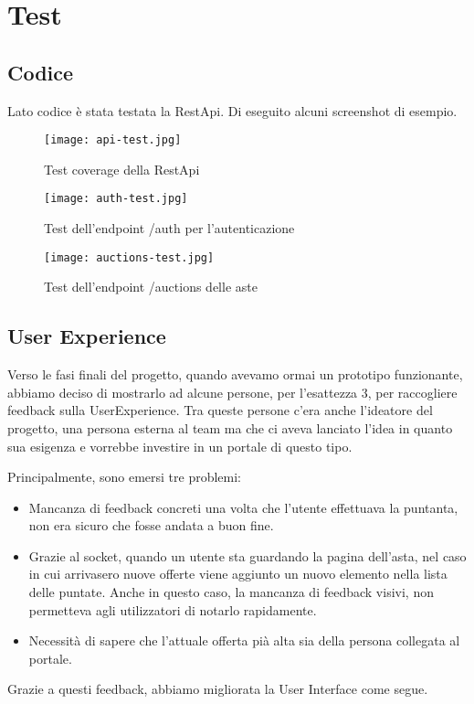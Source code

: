 \section{Test}

\subsection{Codice}
Lato codice è stata testata la RestApi.
Di eseguito alcuni screenshot di esempio.

\begin{figure}[H]
	\centering
	\texttt{[image: api-test.jpg]}
	\caption{Test coverage della RestApi}
	\label{fig:apiTest}
\end{figure}

\begin{figure}[H]
	\centering
	\texttt{[image: auth-test.jpg]}
	\caption{Test dell'endpoint /auth per l'autenticazione}
	\label{fig:authTest}
\end{figure}

\begin{figure}[H]
	\centering
	\texttt{[image: auctions-test.jpg]}
	\caption{Test dell'endpoint /auctions delle aste}
	\label{fig:auctionsTest}
\end{figure}

\clearpage

\subsection{User Experience}
Verso le fasi finali del progetto, quando avevamo ormai un prototipo funzionante, abbiamo deciso di mostrarlo ad alcune persone, per l'esattezza 3, per raccogliere feedback sulla UserExperience.
Tra queste persone c'era anche l'ideatore del progetto, una persona esterna al team ma che ci aveva lanciato l'idea in quanto sua esigenza e vorrebbe investire in un portale di questo tipo.

Principalmente, sono emersi tre problemi:

\begin{itemize}
	\item Mancanza di feedback concreti una volta che l'utente effettuava la puntanta, non era sicuro che fosse andata a buon fine.
	\item Grazie al socket, quando un utente sta guardando la pagina dell'asta, 
	nel caso in cui arrivasero nuove offerte viene aggiunto un nuovo elemento nella lista delle puntate.
	Anche in questo caso, la mancanza di feedback visivi, non permetteva agli utilizzatori di notarlo rapidamente.
	\item Necessità di sapere che l'attuale offerta pià alta sia della persona collegata al portale.
\end{itemize}
\bigbreak
\noindent
Grazie a questi feedback, abbiamo migliorata la User Interface come segue.
\clearpage

